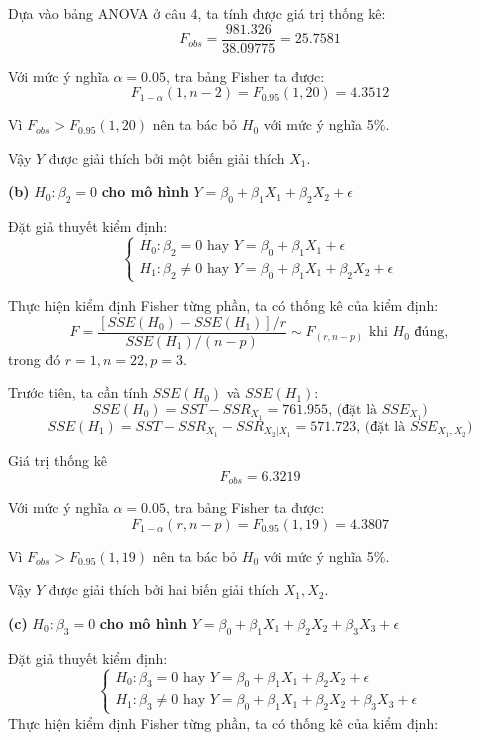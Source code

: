 \documentclass[a4paper]{article}
\theoremstyle{nonumberplain}
\begin{document}
Dựa vào bảng ANOVA ở câu 4, ta tính được giá trị thống kê:
$$F_{obs} = \displaystyle \frac{981.326}{38.09775} = 25.7581$$

Với mức ý nghĩa $\alpha = 0.05$, tra bảng Fisher ta được:
$$F_{1-\alpha}(1,n-2) = F_{0.95}(1,20) = 4.3512$$

Vì $F_{obs}>F_{0.95}(1,20)$ nên ta bác bỏ $H_0$ với mức ý nghĩa 5\%.

Vậy $Y$ được giải thích bởi một biến giải thích $X_1$.

\textbf{(b)} $H_0 : \beta_2 = 0$ \textbf{cho mô hình } $Y = \beta_0 + \beta_1 X_1 + \beta_2 X_2 + \epsilon $

Đặt giả thuyết kiểm định:
\[\begin{cases}
	H_0 : \beta_2 = 0 \text{ hay } Y = \beta_0 + \beta_1 X_1 + \epsilon \\
	H_1 : \beta_2 \ne 0 \text{ hay } Y = \beta_0 + \beta_1 X_1 + \beta_2 X_2 + \epsilon
\end{cases}\]

Thực hiện kiểm định Fisher từng phần, ta có thống kê của kiểm định: 
$$F = \displaystyle \frac{\left [ SSE (H_0) - SSE(H_1) \right ] / r}{SSE(H_1)/(n-p)} \sim F_{(r,n-p)} \text{ khi } H_0 \text{ đúng},$$
trong đó $r = 1, n = 22, p = 3$.

Trước tiên, ta cần tính $SSE (H_0)$ và $SSE(H_1)$:
$$SSE(H_0) = SST - SSR_{X_1} = 761.955 \text{, (đặt là } SSE_{X_1})$$
$$SSE(H_1) = SST - SSR_{X_1} - SSR_{X_2|X_1} = 571.723 \text{, (đặt là }  SSE_{X_1,X_2})$$

Giá trị thống kê $$F_{obs} = 6.3219$$

Với mức ý nghĩa $\alpha = 0.05$, tra bảng Fisher ta được:
$$F_{1-\alpha}(r,n-p) = F_{0.95}(1,19) = 4.3807$$

Vì $F_{obs}>F_{0.95}(1,19)$ nên ta bác bỏ $H_0$ với mức ý nghĩa 5\%.

Vậy $Y$ được giải thích bởi hai biến giải thích $X_1, X_2$.

\textbf{(c)} $H_0 : \beta_3 = 0$ \textbf{cho mô hình } $Y = \beta_0 + \beta_1 X_1 + \beta_2 X_2 + \beta_3 X_3 + \epsilon $

Đặt giả thuyết kiểm định:
\[\begin{cases}
	H_0 : \beta_3 = 0 \text{ hay } Y = \beta_0 + \beta_1 X_1 + \beta_2 X_2 + \epsilon \\
	H_1 : \beta_3 \ne 0 \text{ hay } Y = \beta_0 + \beta_1 X_1 + \beta_2 X_2 + \beta_3 X_3 + \epsilon 
\end{cases}\]
Thực hiện kiểm định Fisher từng phần, ta có thống kê của kiểm định: 
\end{document}
